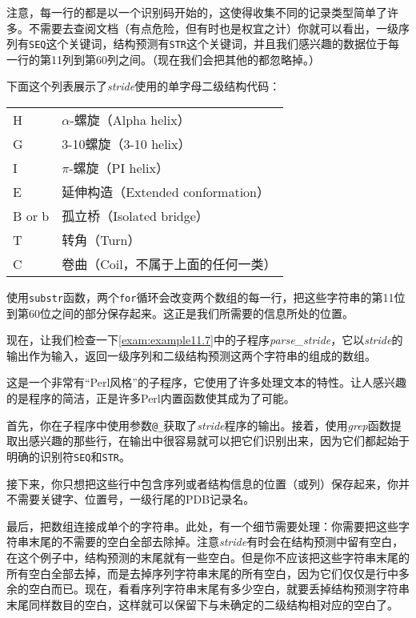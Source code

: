 注意，每一行的都是以一个识别码开始的，这使得收集不同的记录类型简单了许多。不需要去查阅文档（有点危险，但有时也是权宜之计）你就可以看出，一级序列有\verb|SEQ|这个关键词，结构预测有\verb|STR|这个关键词，并且我们感兴趣的数据位于每一行的第11列到第60列之间。（现在我们会把其他的都忽略掉。）

下面这个列表展示了\textit{stride}使用的单字母二级结构代码：

\begin{table}[!htbp]
  \begin{center}
  \begin{tabu} to 0.5\linewidth {X[1,l]X[2,l]}
  \toprule
  H & $\alpha$-螺旋（Alpha helix）\\
  G & 3-10螺旋（3-10 helix）\\
  I & $\pi$-螺旋（PI helix）\\
  E & 延伸构造（Extended conformation）\\
  B or b& 孤立桥（Isolated bridge）\\
  T & 转角（Turn）\\
  C & 卷曲（Coil，不属于上面的任何一类）\\
  \bottomrule
  \end{tabu}
  \end{center}
\end{table}

使用\verb|substr|函数，两个\verb|for|循环会改变两个数组的每一行，把这些字符串的第11位到第60位之间的部分保存起来。这正是我们所需要的信息所处的位置。

现在，让我们检查一下\autoref{exam:example11.7}中的子程序\textit{parse\_stride}，它以\textit{stride}的输出作为输入，返回一级序列和二级结构预测这两个字符串的组成的数组。

这是一个非常有“Perl风格”的子程序，它使用了许多处理文本的特性。让人感兴趣的是程序的简洁，正是许多Perl内置函数使其成为了可能。

首先，你在子程序中使用参数\verb|@_|获取了\textit{stride}程序的输出。接着，使用\textit{grep}函数提取出感兴趣的那些行，在输出中很容易就可以把它们识别出来，因为它们都起始于明确的识别符\verb|SEQ|和\verb|STR|。

接下来，你只想把这些行中包含序列或者结构信息的位置（或列）保存起来，你并不需要关键字、位置号，一级行尾的PDB记录名。

最后，把数组连接成单个的字符串。此处，有一个细节需要处理：你需要把这些字符串末尾的不需要的空白全部去除掉。注意\textit{stride}有时会在结构预测中留有空白，在这个例子中，结构预测的末尾就有一些空白。但是你不应该把这些字符串末尾的所有空白全部去掉，而是去掉序列字符串末尾的所有空白，因为它们仅仅是行中多余的空白而已。现在，看看序列字符串末尾有多少空白，就要丢掉结构预测字符串末尾同样数目的空白，这样就可以保留下与未确定的二级结构相对应的空白了。

